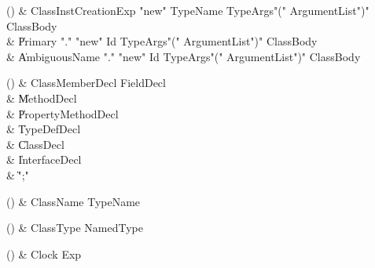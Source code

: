 \begin{bbgrammarappendix}

() & ClassInstCreationExp \label{prod:ClassInstCreationExp}  \: \xcd"new" TypeName TypeArgs\opt \xcd"(" ArgumentList\opt \xcd")" ClassBody\opt  \\

 &    \| Primary \xcd"." \xcd"new" Id TypeArgs\opt \xcd"(" ArgumentList\opt \xcd")" ClassBody\opt \\
 &    \| AmbiguousName \xcd"." \xcd"new" Id TypeArgs\opt \xcd"(" ArgumentList\opt \xcd")" ClassBody\opt \\

\end{bbgrammarappendix}

\begin{bbgrammarappendix}

() & ClassMemberDecl \label{prod:ClassMemberDecl}  \: FieldDecl  \\

 &    \| MethodDecl \\
 &    \| PropertyMethodDecl \\
 &    \| TypeDefDecl \\
 &    \| ClassDecl \\
 &    \| InterfaceDecl \\
 &    \| \xcd";" \\

\end{bbgrammarappendix}

\begin{bbgrammarappendix}

() & ClassName \label{prod:ClassName}  \: TypeName  \\


\end{bbgrammarappendix}

\begin{bbgrammarappendix}

() & ClassType \label{prod:ClassType}  \: NamedType  \\


\end{bbgrammarappendix}

\begin{bbgrammarappendix}

() & Clock \label{prod:Clock}  \: Exp  \\


\end{bbgrammarappendix}

